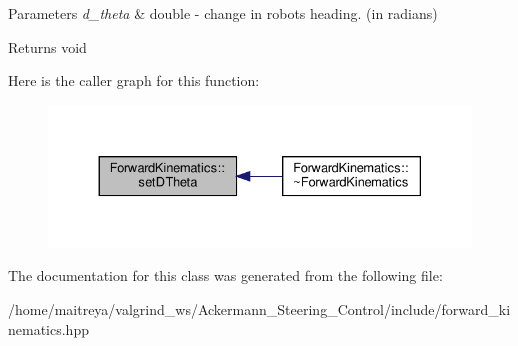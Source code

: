 \begin{DoxyParams}{Parameters}
{\em d\+\_\+theta} & double -\/ change in robot\textquotesingle{}s heading. (in radians) \\
\hline
\end{DoxyParams}
\begin{DoxyReturn}{Returns}
void 
\end{DoxyReturn}
Here is the caller graph for this function\+:
\nopagebreak
\begin{figure}[H]
\begin{center}
\leavevmode
\includegraphics[width=330pt]{classForwardKinematics_ad4093b156610a520068844c7018a256e_icgraph}
\end{center}
\end{figure}


The documentation for this class was generated from the following file\+:\begin{DoxyCompactItemize}
\item 
/home/maitreya/valgrind\+\_\+ws/\+Ackermann\+\_\+\+Steering\+\_\+\+Control/include/forward\+\_\+kinematics.\+hpp\end{DoxyCompactItemize}
